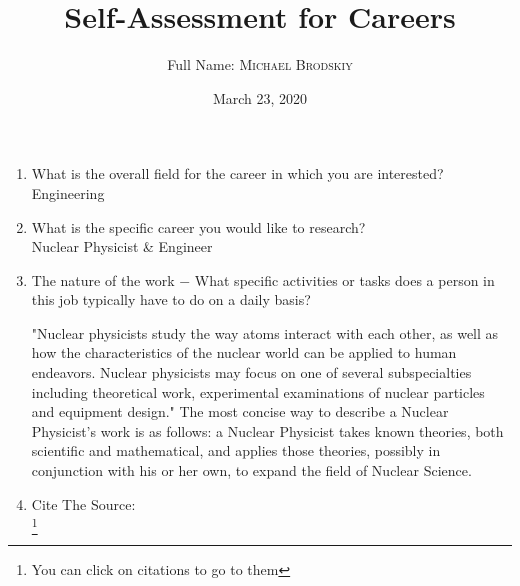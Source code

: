 \documentclass{article}
\title{Self-Assessment for Careers}
\author{Full Name: \textsc{Michael Brodskiy}}
\date{March 23, 2020}
\begin{document}
\maketitle

\begin{enumerate}

    \item What is the overall field for the career in which you are interested?\\
         \vspace{5pt}
         Engineering

    \item What is the specific career you would like to research? \\
        \vspace{5pt}
        Nuclear Physicist \& Engineer

    \item The nature of the work $-$ What specific activities or tasks does a person in this job typically have to do on a daily basis? \\
        \vspace{5pt}
        
        "Nuclear physicists study the way atoms interact with each other, as well as how the characteristics of the nuclear world can be applied to human endeavors. Nuclear physicists may focus on one of several subspecialties including theoretical work, experimental examinations of nuclear particles and equipment design." The most concise way to describe a Nuclear Physicist's work is as follows: a Nuclear Physicist takes known theories, both scientific and mathematical, and applies those theories, possibly in conjunction with his or her own, to expand the field of Nuclear Science.

    \item Cite The Source: \\
        \vspace{5pt}
        \cite{workNature:1}\footnote{You can click on citations to go to them}

\newpage
        

\end{enumerate}
\end{document}
